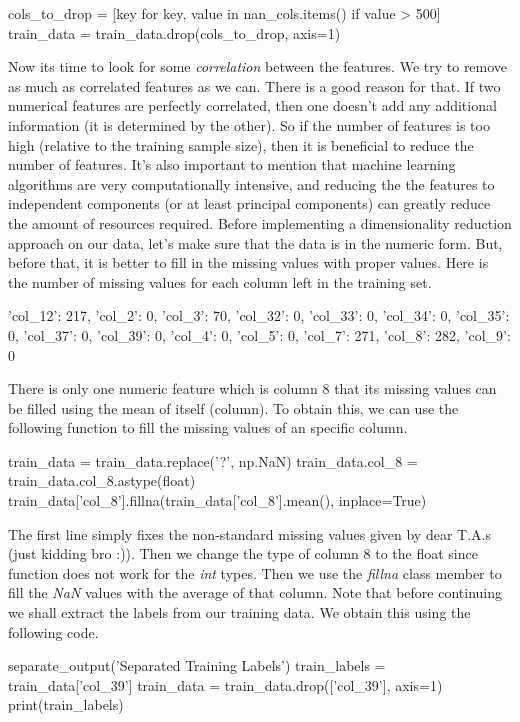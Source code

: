 \documentclass[12pt]{article}
\numberwithin{equation}{section}
\numberwithin{table}{section}
\numberwithin{figure}{section}
\begin{document}
\begin{python}
	cols_to_drop = [key for key, value in nan_cols.items() if value > 500]
	train_data = train_data.drop(cols_to_drop, axis=1)
\end{python}
Now its time to look for some \textit{correlation} between the features. We try to remove as much as correlated features as we can. There is a good reason for that. If two numerical features are perfectly correlated, then one doesn't add any additional information (it is determined by the other). So if the number of features is too high (relative to the training sample size), then it is beneficial to reduce the number of features. It's also important to mention that machine learning algorithms are very computationally intensive, and reducing the the features to independent components (or at least principal components) can greatly reduce the amount of resources required. Before implementing a dimensionality reduction approach on our data, let's make sure that the data is in the numeric form. But, before that, it is better to fill in the missing values with proper values.
\newpage
Here is the number of missing values for each column left in the training set.
\begin{python}
	{
		'col_12': 217,
		'col_2': 0,
		'col_3': 70,
		'col_32': 0,
		'col_33': 0,
		'col_34': 0,
		'col_35': 0,
		'col_37': 0,
		'col_39': 0,
		'col_4': 0,
		'col_5': 0,
		'col_7': 271,
		'col_8': 282,
		'col_9': 0
	}
\end{python}
There is only one numeric feature which is column 8 that its missing values can be filled using the mean of itself (column). To obtain this, we can use the following function to fill the missing values of an specific column.
\begin{python}
	train_data = train_data.replace('?', np.NaN)
	train_data.col_8 = train_data.col_8.astype(float)
	train_data['col_8'].fillna(train_data['col_8'].mean(), inplace=True)
\end{python}
The first line simply fixes the non-standard missing values given by dear T.A.s (just kidding bro :)). Then we change the type of column 8 to the float since  function does not work for the \textit{int} types. Then we use the \textit{fillna} class member to fill the \textit{NaN} values with the average of that column.  Note that before continuing we shall extract the labels from our training data. We obtain this using the following code.
\begin{python}
	separate_output('Separated Training Labels')
	train_labels = train_data['col_39']
	train_data = train_data.drop(['col_39'], axis=1)
	print(train_labels)
\end{python}
\end{document}
